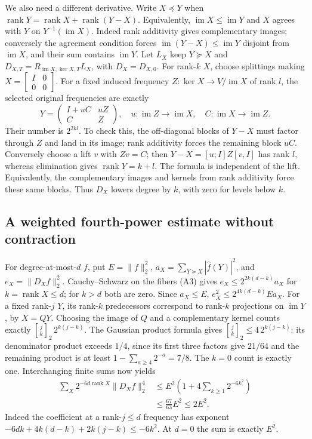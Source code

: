 We also need a different derivative. Write $X\preceq Y$ when
$\operatorname{rank}Y=\operatorname{rank}X+\operatorname{rank}(Y-X)$.
Equivalently, $\operatorname{im}X\le\operatorname{im}Y$ and $X$ agrees
with $Y$ on $Y^{-1}(\operatorname{im}X)$. Indeed rank additivity gives
complementary images; conversely the agreement condition forces
$\operatorname{im}(Y-X)\le\operatorname{im}Y$ disjoint from
$\operatorname{im}X$, and their sum contains $\operatorname{im}Y$.
Let $L_X$ keep $Y\succeq X$ and
$D_{X,T}=R_{\operatorname{im}X,\ker X,T}L_X$, with $D_X=D_{X,0}$.
For rank-$k$ $X$, choose splittings making $X=\left[\begin{smallmatrix}I&0\\0&0\end{smallmatrix}\right]$.
For a fixed induced frequency $Z:\ker X\to V/\operatorname{im}X$ of
rank $l$, the selected original frequencies are exactly
\[
 Y=\begin{pmatrix}I+uC&uZ\\ C&Z\end{pmatrix},
 \quad u:\operatorname{im}Z\to\operatorname{im}X,
 \quad C:\operatorname{im}X\to\operatorname{im}Z.     \tag{A3}
\]
Their number is $2^{2kl}$. To check this, the off-diagonal blocks of
$Y-X$ must factor through $Z$ and land in its image; rank additivity
forces the remaining block $uC$. Conversely choose a lift $v$ with
$Zv=C$; then $Y-X=[u;I]Z[v,I]$ has rank $l$, whereas elimination gives
$\operatorname{rank}Y=k+l$. The formula is independent of the lift.
Equivalently, the complementary images and kernels from rank additivity
force these same blocks. Thus $D_X$ lowers degree by $k$, with zero for
levels below $k$.

\subsection{A weighted fourth-power estimate without contraction}
For degree-at-most-$d$ $f$, put $E=\|f\|_2^2$,
$a_X=\sum_{Y\succeq X}|\widehat f(Y)|^2$, and $e_X=\|D_Xf\|_2^2$.
Cauchy--Schwarz on the fibers (A3) gives
$e_X\le2^{2k(d-k)}a_X$ for $k=\operatorname{rank}X\le d$; for $k>d$
both are zero. Since $a_X\le E$,
$e_X^2\le2^{4k(d-k)}Ea_X$.
For a fixed rank-$j$ $Y$, its rank-$k$ predecessors correspond to rank-$k$
projections on $\operatorname{im}Y$, by $X=QY$. Choosing the image of
$Q$ and a complementary kernel counts exactly
$\genfrac{[}{]}{0pt}{}{j}{k}_2\,2^{k(j-k)}$. The Gaussian product formula gives
$\genfrac{[}{]}{0pt}{}{j}{k}_2\le4\,2^{k(j-k)}$: its denominator product exceeds
$1/4$, since its first three factors give $21/64$ and the remaining
product is at least $1-\sum_{a\ge4}2^{-a}=7/8$.
The $k=0$ count is exactly one. Interchanging finite sums now yields
\[
 \begin{split}
 \sum_X2^{-6d\operatorname{rank}X}\|D_Xf\|_2^4
 &\le E^2\left(1+4\sum_{k\ge1}2^{-6k^2}\right)\\
 &\le\frac{67}{63}E^2\le2E^2.                       \end{split}\tag{W6}
\]
Indeed the coefficient at a rank-$j\le d$ frequency has exponent
$-6dk+4k(d-k)+2k(j-k)\le-6k^2$.
At $d=0$ the sum is exactly $E^2$.

